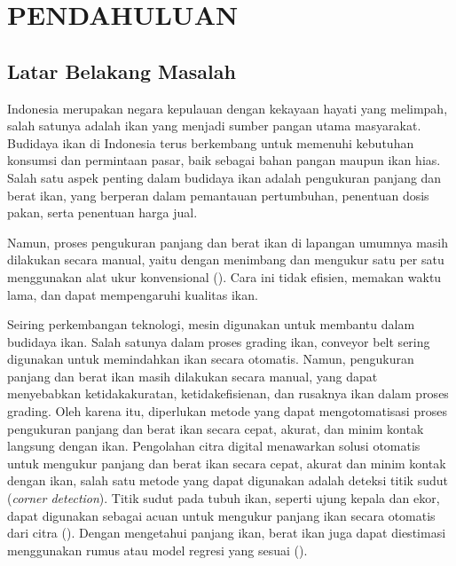 
\chapter{PENDAHULUAN}

\section{Latar Belakang Masalah}

Indonesia merupakan negara kepulauan dengan kekayaan hayati yang melimpah, salah satunya adalah ikan yang menjadi sumber pangan utama masyarakat. Budidaya ikan di Indonesia terus berkembang untuk memenuhi kebutuhan konsumsi dan permintaan pasar, baik sebagai bahan pangan maupun ikan hias. Salah satu aspek penting dalam budidaya ikan adalah pengukuran panjang dan berat ikan, yang berperan dalam pemantauan pertumbuhan, penentuan dosis pakan, serta penentuan harga jual.

Namun, proses pengukuran panjang dan berat ikan di lapangan umumnya masih dilakukan secara manual, yaitu dengan menimbang dan mengukur satu per satu menggunakan alat ukur konvensional (\cite{Amri2020}). Cara ini tidak efisien, memakan waktu lama, dan dapat mempengaruhi kualitas ikan.

Seiring perkembangan teknologi, mesin digunakan untuk membantu dalam budidaya ikan. Salah satunya dalam proses grading ikan, conveyor belt sering digunakan untuk memindahkan ikan secara otomatis. Namun, pengukuran panjang dan berat ikan masih dilakukan secara manual, yang dapat menyebabkan ketidakakuratan, ketidakefisienan, dan rusaknya ikan dalam proses grading. Oleh karena itu, diperlukan metode yang dapat mengotomatisasi proses pengukuran panjang dan berat ikan secara cepat, akurat, dan minim kontak langsung dengan ikan.
Pengolahan citra digital menawarkan solusi otomatis untuk mengukur panjang dan berat ikan secara cepat, akurat dan minim kontak dengan ikan, salah satu metode yang dapat digunakan adalah deteksi titik sudut (\emph{corner detection}). Titik sudut pada tubuh ikan, seperti ujung kepala dan ekor, dapat digunakan sebagai acuan untuk mengukur panjang ikan secara otomatis dari citra (\cite{Harris2013}). Dengan mengetahui panjang ikan, berat ikan juga dapat diestimasi menggunakan rumus atau model regresi yang sesuai (\cite{Diansari2013}).

